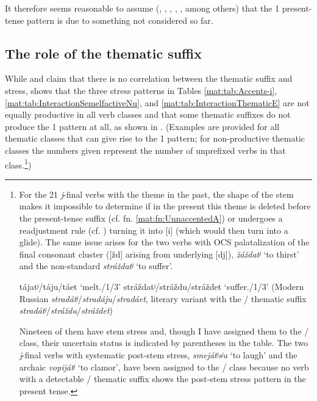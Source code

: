 \documentclass[output=paper,colorlinks,citecolor=black,koreanfont]{langscibook}
\begin{document}
\noindent It therefore seems reasonable to assume (\citealt[328]{Halle1973}, \citealt[291]{Melvold1989}, \citealt[124]{Idsardi1992}, \citealt[114--117]{Gladney1995}, \citealt{Feldstein2015}, among others) that the {1\SG} present-tense pattern is due to something not considered so far.

\subsection{The role of the thematic suffix}\label{mat:subsec:Role}

While \citet{Redkin1965} and \citet{Zaliznjak1985} claim that there is no correlation between the thematic suffix and stress, \citet{Slioussar2012} shows that the three stress patterns in Tables \ref{mat:tab:Accents-i}, \ref{mat:tab:InteractionSemelfactiveNu}, and \ref{mat:tab:InteractionThematicE} are not equally productive in all verb classes and that some thematic suffixes do not produce the {1\SG} pattern at all, as shown in . (Examples are provided for all thematic classes that can give rise to the {1\SG} pattern; for non-productive thematic classes the numbers given represent the number of unprefixed verbs in that class.\footnote{\label{mat:fn:j-final-verbs}For the 21 \textit{j}-final verbs with the theme  in the past, the shape of the stem makes it impossible to determine if in the present this theme is deleted before the present-tense suffix (cf. fn. \ref{mat:fn:UnnaccentedA}) or undergoes a readjustment rule (cf. \citealt{Matushansky2023a}) turning it into [i] (which would then turn into a glide). The same issue arises for the two verbs with OCS palatalization of the final consonant cluster ([žd] arising from underlying [dj]), \textit{žáždatʲ} ‘to thirst’ and the non-standard \textit{stráždatʲ} ‘to suffer’.

\ea
\ea tájatʲ/táju/táet ‘melt.{\INF}/{1\SG}/{3\SG}’
\ex stráždatʲ/stráždu/stráždet ‘suffer.{\INF}/{1\SG}/{3\SG}’ (Modern Russian \textit{stradátʲ}/\textit{stradáju}/\textit{stradáet}, literary variant with the / thematic suffix \textit{stradátʲ}/\textit{stráždu}/\textit{stráždet})
\z
\z

\noindent Nineteen of them have stem stress and, though I have assigned them to the / class, their uncertain status is indicated by parentheses in the table. The two \textit{j}-final verbs with systematic post-stem stress, \textit{smejátʲsʲa} ‘to laugh’ and the archaic \textit{vopijátʲ} ‘to clamor’, have been assigned to the / class because no verb with a detectable / thematic suffix shows the post-stem stress pattern in the present tense.})
\end{document}
